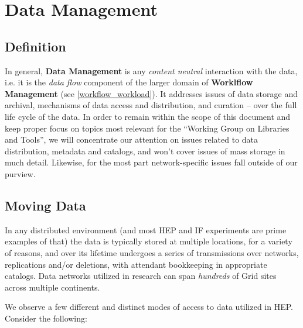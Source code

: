 \section{Data Management}
\label{data}


\subsection{Definition}
In general, \textbf{Data Management} is any \textit{content neutral} interaction with the data, i.e. it is the \textit{data flow}
component of the larger domain of  \textbf{Worklflow Management} (see \ref{workflow_workload}). It addresses issues of data storage
and archival, mechanisms of data access and distribution, and  curation -- over the full life cycle of the data. In order to remain within
the scope of this document and keep  proper focus on topics most relevant for the ``Working Group on Libraries and Tools'', we will
concentrate our attention on issues related to data distribution, metadata and catalogs, and won't cover issues of mass storage
in much detail. Likewise, for the most part network-specific issues fall outside of our purview.



\subsection{Moving Data}
In any distributed environment (and most HEP and IF experiments are prime examples of that) the data is typically stored at multiple locations,
for a variety of reasons, and over its lifetime undergoes a series of transmissions over networks, replications and/or deletions, with attendant bookkeeping
in appropriate catalogs. Data networks utilized in research can span \textit{hundreds} of Grid sites across multiple continents.

We observe a few different and distinct modes of access to data utilized in HEP. Consider the following:

